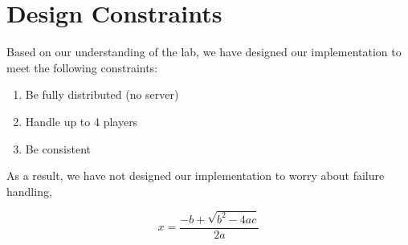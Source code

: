 \message{ !name(report.tex)}\documentclass[12pt]{article}
\begin{document}
\section{Design Constraints}

Based on our understanding of the lab, we have designed our implementation to meet the following constraints:

\begin{enumerate}
\item Be fully distributed (no server)
\item Handle up to 4 players
\item Be consistent
\end{enumerate}

As a result, we have not designed our implementation to worry about failure handling, 

$$ x = \frac{-b+\sqrt{b^2-4ac}}{2a} $$

\end{document}
